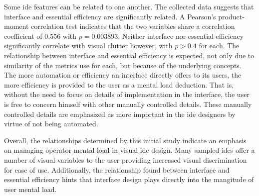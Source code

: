 Some \ac{ide} features can be related to one another. The collected data
suggests that interface and essential efficiency are significantly related.
A Pearson's product-moment correlation test indicates that the two
variables share a correlation coefficient of $0.556$ with $p=0.003893$.
Neither interface nor essential efficiency significantly correlate with
visual clutter however, with $p>0.4$ for each.  The relationship between
interface and essential efficiency is expected, not only due to similarity
of the metrics use for each, but because of the underlying concepts. The
more automation or efficiency an interface directly offers to its users,
the more efficiency is provided to the user as a mental load deduction.
That is, without the need to focus on details of implementation in the
interface, the user is free to concern himself with other manually
controlled details. These manually controlled details are emphasized as
more important in the \ac{ide} designers by virtue of not being automated.

Overall, the relationships determined by this initial study indicate an
emphasis on managing operator mental load in visual \ac{ide} design. Many
sampled \acp{ide} offer a number of visual variables to the user providing
increased visual discrimination for ease of use. Additionally, the
relationship found between interface and essential efficiency hints that
interface design plays directly into the mangitude of user mental load.

